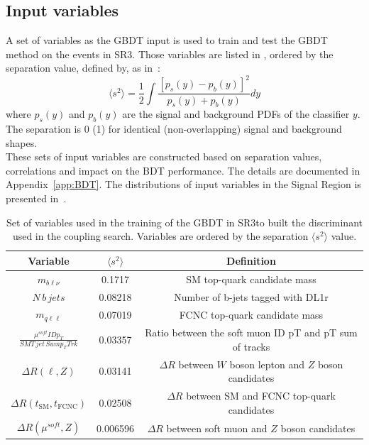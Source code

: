 \subsection {Input variables}
A set of variables as the GBDT input is used to train and test the GBDT method on the events in
SR3\tZc. Those variables are listed in , ordered by the separation value, defined by, as in~\cite{TMVA}:
\begin{equation*}
\langle s^{2}\rangle = \frac{1}{2}\int \frac{[p_{s}(y)-p_{b}(y)]^{2}}{p_{s}(y)+p_{b}(y)}dy
\end{equation*}
where $p_{s}(y)$ and $p_{b}(y)$ are the signal and background PDFs of the classifier $y$. 
The separation is 0 (1) for identical (non-overlapping) signal and background shapes.\\
These sets of input variables are constructed based on separation values, correlations and impact on the BDT performance. The details are documented in Appendix~\ref{app:BDT}.  
The distributions of input variables in the Signal Region is presented in~.

\begin{table}[!htbp]
	\small
	\centering
	\begin{tabular}{ccc}
		\toprule
		Variable & $\langle s^{2}\rangle$  & Definition \\
		\midrule
		$m_{b\ell\nu}$  &  0.1717  &  SM top-quark candidate mass  \\
		$N\,b\,jets$  &  0.08218  &  Number of b-jets tagged with DL1r  \\
		$m_{q\ell\ell}$  &  0.07019  &  FCNC top-quark candidate mass  \\
		$\frac{\mu^{soft} ID p_{T}}{SMT\,jet\,Sum p_{T} Trk}$  &  0.03357  &  Ratio between the soft muon ID pT and pT sum of tracks  \\
		$\Delta R(\ell,Z)$  &  0.03141  &  $\Delta R$ between $W$ boson lepton and $Z$ boson candidates  \\
		$\Delta R(t_{\text{SM}},t_{\text{FCNC}})$  &  0.02508  &  $\Delta R$ between SM and FCNC top-quark candidates  \\
		$\Delta R(\mu^{soft},Z)$  &  0.006596  &  $\Delta R$ between soft muon and $Z$ boson candidates  \\
		\bottomrule
	\end{tabular}
	\caption{
	Set of variables used in the training of the GBDT in SR3\tZc to built the \Dthree discriminant used in the \tZc coupling search. Variables are ordered by the separation 	$\langle s^{2}\rangle$ value. }
	\label{tab:D3input}
\end{table}

